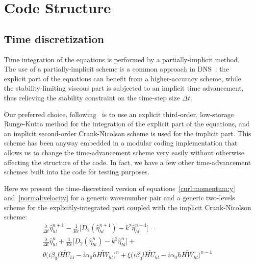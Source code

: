 \chapter{Code Structure}





\section{Time discretization}
Time integration of the equations is performed by a partially-implicit method.
The use of a partially-implicit scheme is a common approach in DNS~\cite{kim_moin_moser}: the explicit part of the equations can benefit from a higher-accuracy scheme, while the stability-limiting viscous part is subjected to an implicit time advancement, thus relieving the stability constraint on the time-step size $	\Delta t$. \par
Our preferred choice, following~\cite{ns:quadrio}\cite{kim_moin_moser} is to use an explicit third-order, low-storage Runge-Kutta method for the integration of the explicit part of the equations, and an implicit second-order Crank-Nicolson scheme is used for the implicit part. This scheme has been anyway embedded in a modular coding implementation that allows us to change the time-advancement scheme very easily without otherwise affecting the structure of the code. In fact, we have a few other time-advancement schemes built into the code for testing purposes. \par
 Here we present the time-discretized version of equations~\ref{curl:momentum:y} and~\ref{normal:velocity} for a generic wavenumber pair and a generic two-levels scheme for the explicitly-integrated part coupled with the implicit Crank-Nicolson scheme:
\begin{multline}
\frac{\lambda}{\Delta t} \hat{\eta}_{hl}^{n+1} -\frac{1}{Re} \big[ D_{2} (\hat{\eta}_{hl}^{n+1}) - k^{2} \hat{\eta}_{hl}^{n+1} \big] = \\
\frac{\lambda}{\Delta t} \hat{\eta}_{hl}^{n} + \frac{1}{Re} \big[ D_{2} (\hat{\eta}_{hl}^{n}) - k^{2} \hat{\eta}_{hl}^{n} \big] + \\
\theta \bigg( i\beta_{0}l\widehat{HU}_{hl} - i\alpha_{0}h\widehat{HW}_{hl} \bigg)^{n} + \xi \bigg( i\beta_{0}l\widehat{HU}_{hl} - i\alpha_{0}h \widehat{HW}_{hl} \bigg)^{n-1}
\end{multline}
